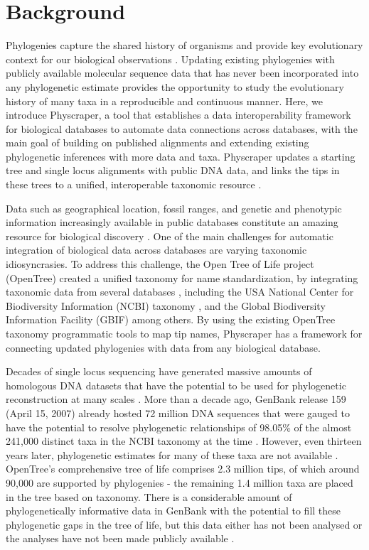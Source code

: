 \documentclass{bmcart}
\begin{document}

\section*{Background}
Phylogenies capture the shared history of organisms and provide key evolutionary
context for our biological observations \cite{dobzhansky1973nothing}.
Updating existing phylogenies with publicly available molecular sequence data that
has never been
incorporated into any phylogenetic estimate provides the opportunity to study
the evolutionary history of many taxa in a reproducible and continuous manner.
Here, we introduce Physcraper, a tool that establishes a data interoperability
framework for biological databases to automate data connections across databases,
with the main goal of building on published alignments and extending existing
phylogenetic inferences with more data and taxa.
Physcraper updates a starting tree and single locus alignments
with public DNA data, and links the tips in these trees to a unified, interoperable
taxonomic resource \cite{rees2017automated}.

Data such as
geographical location, fossil ranges, and genetic and phenotypic information increasingly
available in public databases constitute an amazing
resource for biological discovery \cite{baxevanis2015importance}.
One of the main challenges for automatic
integration of biological data across databases are varying taxonomic idiosyncrasies.
To address this challenge, the Open Tree of Life project (OpenTree)
created a unified taxonomy for name standardization, by integrating taxonomic
data from several databases \cite{rees2017automated}, including the USA National
Center for Biodiversity Information (NCBI) taxonomy \cite{federhen_ncbi_2012, schoch_ncbi_2020},
and the Global Biodiversity Information Facility (GBIF) \cite{gbif_secretariat_gbif_2019} among others.
By using the existing OpenTree taxonomy programmatic tools to map tip names,
Physcraper has a framework for connecting updated phylogenies with data from any
biological database.

Decades of single locus sequencing have generated
massive amounts of homologous DNA datasets that have the potential to be used for phylogenetic
reconstruction at many scales \cite{sanderson2008phylota}.
More than a decade ago, GenBank release 159 (April 15, 2007) already hosted 72
million DNA sequences that were gauged to have the potential to resolve phylogenetic
relationships of 98.05\% of the almost 241,000
distinct taxa in the NCBI taxonomy at the time \cite{sanderson2008phylota}.
However, even thirteen years later, phylogenetic estimates for many of these taxa are not available \cite{mctavish_how_2017}.
OpenTree's comprehensive tree of life comprises 2.3 million tips, of which around
90,000 are supported by phylogenies - the remaining 1.4 million taxa are placed
in the tree based on taxonomy.
There is a considerable amount of phylogenetically
informative data in GenBank with the potential to fill these phylogenetic gaps in
the tree of life, but this data either has not been analysed or the analyses
have not been made publicly available \cite{mctavish_how_2017}.
\end{document}

